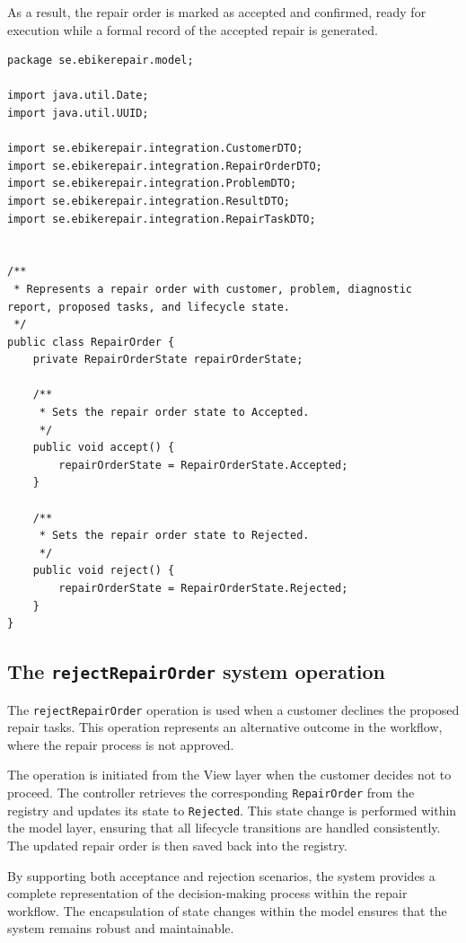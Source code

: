 \documentclass[a4paper]{scrartcl}
\begin{document}
As a result, the repair order is marked as accepted and confirmed, ready for execution while a formal record of the accepted repair is generated.

\begin{lstlisting}[style=javastyle, caption={Main class entry point}]
package se.ebikerepair.model;

import java.util.Date;
import java.util.UUID;

import se.ebikerepair.integration.CustomerDTO;
import se.ebikerepair.integration.RepairOrderDTO;
import se.ebikerepair.integration.ProblemDTO;
import se.ebikerepair.integration.ResultDTO;
import se.ebikerepair.integration.RepairTaskDTO;


/**
 * Represents a repair order with customer, problem, diagnostic report, proposed tasks, and lifecycle state.
 */
public class RepairOrder {
    private RepairOrderState repairOrderState;

    /**
     * Sets the repair order state to Accepted.
     */
    public void accept() {
        repairOrderState = RepairOrderState.Accepted;
    }

    /**
     * Sets the repair order state to Rejected.
     */
    public void reject() {
        repairOrderState = RepairOrderState.Rejected;
    }
}

\end{lstlisting}

\subsection{The \texttt{rejectRepairOrder} system operation}

The \texttt{rejectRepairOrder} operation is used when a customer declines the proposed repair tasks. This operation represents an alternative outcome in the workflow, where the repair process is not approved.

The operation is initiated from the View layer when the customer decides not to proceed. The controller retrieves the corresponding \texttt{RepairOrder} from the registry and updates its state to \texttt{Rejected}. This state change is performed within the model layer, ensuring that all lifecycle transitions are handled consistently. The updated repair order is then saved back into the registry.

By supporting both acceptance and rejection scenarios, the system provides a complete representation of the decision-making process within the repair workflow. The encapsulation of state changes within the model ensures that the system remains robust and maintainable.
\end{document}
